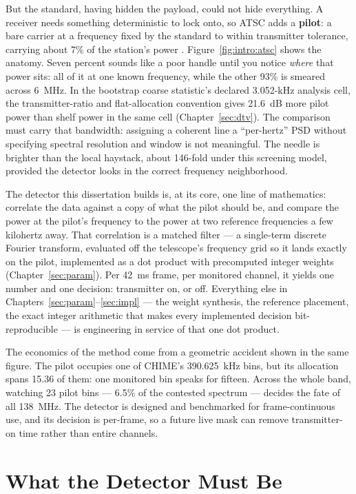 But the standard, having hidden the payload, could not hide everything. A receiver needs something deterministic to lock onto, so ATSC adds a \textbf{pilot}: a bare carrier at a frequency fixed by the standard to within transmitter tolerance, carrying about 7\% of the station's power \cite{atsc-a53}. Figure~\ref{fig:intro:atsc} shows the anatomy. Seven percent sounds like a poor handle until you notice \emph{where} that power sits: all of it at one known frequency, while the other 93\% is smeared across 6~MHz. In the bootstrap coarse statistic's declared 3.052-kHz analysis cell, the transmitter-ratio and flat-allocation convention gives 21.6~dB more pilot power than shelf power in the same cell (Chapter~\ref{sec:dtv}). The comparison must carry that bandwidth: assigning a coherent line a ``per-hertz'' PSD without specifying spectral resolution and window is not meaningful. The needle is brighter than the local haystack, about 146-fold under this screening model, provided the detector looks in the correct frequency neighborhood.

The detector this dissertation builds is, at its core, one line of mathematics: correlate the data against a copy of what the pilot should be, and compare the power at the pilot's frequency to the power at two reference frequencies a few kilohertz away. That correlation is a matched filter --- a single-term discrete Fourier transform, evaluated off the telescope's frequency grid so it lands exactly on the pilot, implemented as a dot product with precomputed integer weights (Chapter~\ref{sec:param}). Per 42~ms frame, per monitored channel, it yields one number and one decision: transmitter on, or off. Everything else in Chapters~\ref{sec:param}--\ref{sec:impl} --- the weight synthesis, the reference placement, the exact integer arithmetic that makes every implemented decision bit-reproducible --- is engineering in service of that one dot product.

The economics of the method come from a geometric accident shown in the same figure. The pilot occupies one of CHIME's 390.625~kHz bins, but its allocation spans 15.36 of them: one monitored bin speaks for fifteen. Across the whole band, watching 23 pilot bins --- 6.5\% of the contested spectrum --- decides the fate of all 138~MHz. The detector is designed and benchmarked for frame-continuous use, and its decision is per-frame, so a future live mask can remove transmitter-on time rather than entire channels.

\section{What the Detector Must Be}
\label{sec:intro:requirements}

